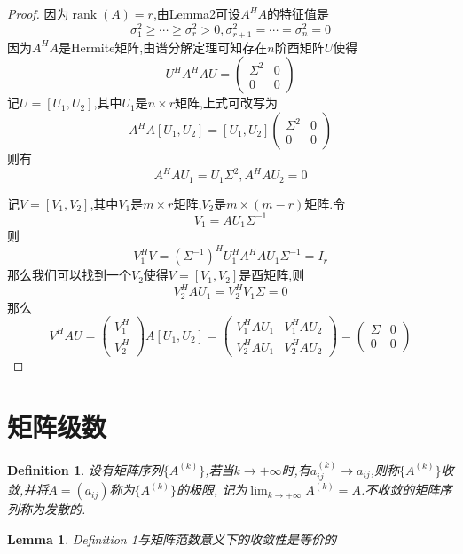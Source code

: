 \documentclass{ctexart}
\newtheorem{lemma}{Lemma}
\newtheorem{definition}{Definition}
\DeclareMathOperator*{\rank}{rank}
\begin{document}
    \begin{proof}
        因为$\rank(A)=r$,由Lemma2可设$A^HA$的特征值是
        $$\sigma^2_1\geq\cdots\geq\sigma^2_r>0,\sigma^2_{r+1}=\cdots=\sigma^2_{n}=0$$
        因为$A^HA$是Hermite矩阵,由谱分解定理可知存在$n$阶酉矩阵$U$使得
        $$U^HA^HAU=
        \begin{pmatrix}
            \Sigma^2 & 0 \\
            0 & 0
        \end{pmatrix}
        $$
        记$U=[U_1,U_2]$,其中$U_1$是$n\times r$矩阵,上式可改写为
        $$
        A^HA[U_1,U_2]=[U_1,U_2]
        \begin{pmatrix}
            \Sigma^2 & 0 \\
            0 & 0
        \end{pmatrix}
        $$
        则有
        $$A^HAU_1=U_1\Sigma^2,A^HAU_2=0$$

        记$V=[V_1,V_2]$,其中$V_1$是$m\times r$矩阵,$V_2$是$m\times(m-r)$矩阵.令
        $$V_1=AU_1\Sigma^{-1}$$
        则
        $$V^H_1V=(\Sigma^{-1})^HU^H_1A^HAU_1\Sigma^{-1}=I_r$$
        那么我们可以找到一个$V_2$使得$V=[V_1,V_2]$是酉矩阵,则
        $$V^H_2AU_1=V^H_2V_1\Sigma=0$$
        那么
        $$V^HAU=
        \begin{pmatrix}
            V^H_1 \\
            V^H_2
        \end{pmatrix}A[U_1,U_2]=
        \begin{pmatrix}
            V^H_1AU_1 & V^H_1AU_2 \\
            V^H_2AU_1 & V^H_2AU_2
        \end{pmatrix}=
        \begin{pmatrix}
            \Sigma & 0 \\
            0 & 0
        \end{pmatrix}
        $$
    \end{proof}
\section{矩阵级数}
    \begin{definition}
        设有矩阵序列$\{A^{(k)}\}$,若当$k\to+\infty$时,有$a_{ij}^{(k)}\to a_{ij}$,则称$\{A^{(k)}\}$收敛,并将$A=(a_{ij})$称为$\{A^{(k)}\}$的极限,
        记为$\lim_{k\to+\infty}A^{(k)}=A$.不收敛的矩阵序列称为发散的.
    \end{definition}
    \begin{lemma}
        Definition 1与矩阵范数意义下的收敛性是等价的
    \end{lemma}
\end{document}
